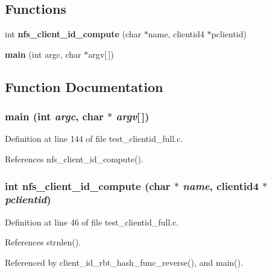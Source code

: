 \subsection*{Functions}
\begin{CompactItemize}
\item 
int {\bf nfs\_\-client\_\-id\_\-compute} (char $\ast$name, clientid4 $\ast$pclientid)
\item 
{\bf main} (int argc, char $\ast$argv[$\,$])
\end{CompactItemize}


\subsection{Function Documentation}
\subsubsection{\setlength{\rightskip}{0pt plus 5cm}main (int {\em argc}, char $\ast$ {\em argv}[$\,$])}\label{test__clientid__full_8c_a1}




Definition at line 144 of file test\_\-clientid\_\-full.c.

References nfs\_\-client\_\-id\_\-compute().
\subsubsection{\setlength{\rightskip}{0pt plus 5cm}int nfs\_\-client\_\-id\_\-compute (char $\ast$ {\em name}, clientid4 $\ast$ {\em pclientid})}\label{test__clientid__full_8c_a0}




Definition at line 46 of file test\_\-clientid\_\-full.c.

References strnlen().

Referenced by client\_\-id\_\-rbt\_\-hash\_\-func\_\-reverse(), and main().